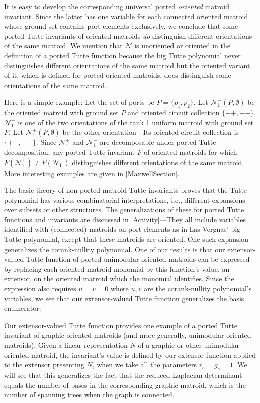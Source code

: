 \documentclass[12pt]{article}
\theoremstyle{definition}
\begin{document}
It is
easy to develop the corresponding universal ported \emph{oriented} matroid invariant.
Since the latter has one variable for each connected oriented 
matroid whose ground set
contains port elements exclusively, we conclude that some ported Tutte
invariants of oriented matroids \emph{do} distinguish different 
orientations of the same matroid. 
We mention that $\mathcal{N}$ is unoriented or
oriented in the definition of a ported Tutte function
because the big Tutte polynomial never distinguishes
different orientations of the same matroid but
the oriented variant of it, which is defined for
ported oriented matroids, does distinguish some
orientations of the same matroid.

Here is a simple example:  Let the set of ports be $P=\{p_1,p_2\}$.  
Let $\mathcal{N}_1^-(P,\emptyset)$ be the oriented matroid 
with ground set $P$ and oriented
circuit collection $\{++,--\}$. $\mathcal{N}_1^-$ is one of the 
two orientations of the 
rank 1 uniform matroid with ground set $P$.
Let $\mathcal{N}_1^+(P,\emptyset)$ be the other orientation---Its oriented circuit 
collection
is $\{+-,-+\}$.  Since $\mathcal{N}_1^+$ and $\mathcal{N}_1^-$ are 
decomposable under ported Tutte
decomposition, any ported Tutte invariant $F$ of oriented matroids for which
$F(\mathcal{N}_1^+)\neq F(\mathcal{N}_1^-)$ distinguishes different 
orientations of the same matroid.  More interesting examples are given in
\textsection \ref{MaxwellSection}.

The basic theory of non-ported matroid Tutte invariants proves that the
Tutte polynomial has various combinatorial interpretations, i.e., different
expansions over subsets or other structures.  The generalizations of these
for ported Tutte functions and invariants are discussed in \textsection 
\ref{Activity}---They 
all include variables identified with (connected) matroids
on port elements as in Las Vergnas' big Tutte polynomial, except that 
these matroids are oriented.
One such expansion generalizes the corank-nullity polynomial.
One of our results is that our 
extensor-valued Tutte function of ported unimodular oriented matroids
can be expressed by replacing  
each oriented matroid monomial by this function's value, an extensor,
on the oriented matroid which the monomial identifies.
Since the expression also requires $u=v=0$ where $u,v$ are the 
corank-nullity polynomial's variables, we see that our extensor-valued
Tutte function generalizes the basis enumerator.

Our extensor-valued Tutte function provides one 
example of a ported Tutte invariant of graphic oriented matroids (and more
generally, unimodular oriented matroids).  Given a linear representation $N$
of a graphic or other unimodular oriented matroid, the invariant's value
is defined by our extensor function applied to the extensor presenting
$N$, when we take all the parameters $r_e=g_e=1$.  We will see that this
generalizes the fact that the reduced Laplacian determinant equals the number 
of bases in the corresponding graphic matroid, which is the number of 
spanning trees when the graph is connected.
\end{document}
